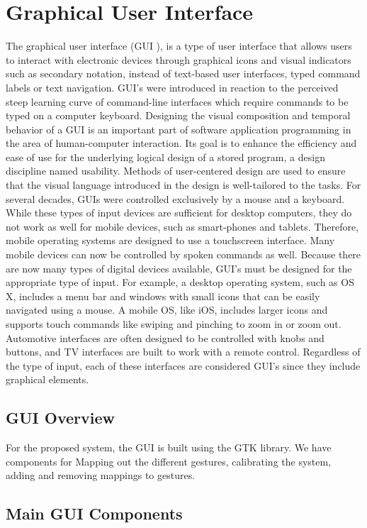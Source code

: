 \documentclass[11pt]{report}
\begin{document}
\chapter{Graphical User Interface}
The graphical user interface (GUI ), is a type of user interface that allows users to interact with
electronic devices through graphical icons and visual indicators such as secondary notation, instead
of text-based user interfaces, typed command labels or text navigation. GUI's were introduced in
reaction to the perceived steep learning curve of command-line interfaces which require commands
to be typed on a computer keyboard.
Designing the visual composition and temporal behavior of a GUI is an important part of
software application programming in the area of human-computer interaction. Its goal is to enhance
the efficiency and ease of use for the underlying logical design of a stored program, a design discipline
named usability. Methods of user-centered design are used to ensure that the visual language
introduced in the design is well-tailored to the tasks.
For several decades, GUIs were controlled exclusively by a mouse and a keyboard. While these
types of input devices are sufficient for desktop computers, they do not work as well for mobile
devices, such as smart-phones and tablets. Therefore, mobile operating systems are designed to use
a touchscreen interface. Many mobile devices can now be controlled by spoken commands as well.
Because there are now many types of digital devices available, GUI's must be designed for the
appropriate type of input. For example, a desktop operating system, such as OS X, includes a
menu bar and windows with small icons that can be easily navigated using a mouse. A mobile OS,
like iOS, includes larger icons and supports touch commands like swiping and pinching to zoom in
or zoom out. Automotive interfaces are often designed to be controlled with knobs and buttons,
and TV interfaces are built to work with a remote control. Regardless of the type of input, each of
these interfaces are considered GUI's since they include graphical elements.
\section{GUI Overview}

For the proposed system, the GUI is built using the GTK library. We have components for Mapping out the 
different gestures, calibrating the system, adding and removing mappings to gestures.  

\section{Main GUI Components}
\end{document}
